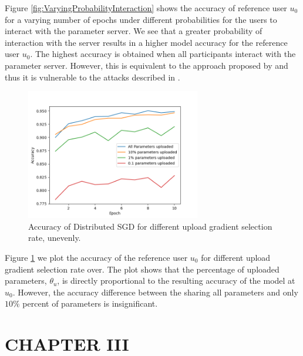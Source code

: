 \documentclass[letterpaper]{article}
\begin{document}
\begin{flushleft}
{Figure \ref{fig:VaryingProbabilityInteraction} shows the accuracy of reference user $u_0$ for a varying number of epochs under
different probabilities for the users to interact with the parameter server. 
We see that a greater probability of interaction with the server results in a higher model accuracy for the reference user $u_0$.
The highest accuracy is obtained when all participants interact with the parameter server. However, this is equivalent to the
approach proposed by \cite{shokri2015privacy} and thus it is vulnerable to the attacks described in \cite{hitaj2017deep}. 


\begin{figure}[H]
  \centering
    \includegraphics[width=3in]{VaryingThetaU.png}
    \caption[Different upload gradient selection rate]{\label{fig:VaryingThetaU}Accuracy of Distributed SGD for different upload gradient selection rate, unevenly.}
  \end{figure}



Figure \ref{fig:VaryingThetaU} we plot the accuracy of the reference user $u_0$ for different upload gradient selection rate over. 
The plot shows that the percentage of uploaded parameters, $\theta_u$, is directly proportional to the resulting accuracy of
the model at $u_0$. However, the accuracy difference between the sharing all parameters and only $ 10\% $ percent of parameters is
insignificant.





\pagebreak
\section*{CHAPTER III}
\vspace{0.25in}
}
\end{flushleft}
\end{document}
